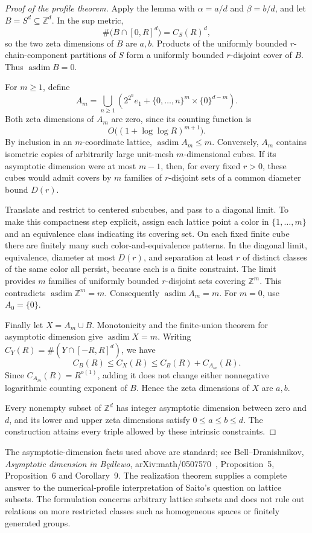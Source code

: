 \documentclass[11pt,a4paper]{article}
\theoremstyle{definition}
\theoremstyle{remark}
\numberwithin{equation}{section}
\begin{document}
\begin{proof}[Proof of the profile theorem]
Apply the lemma with $\alpha=a/d$ and $\beta=b/d$, and let $B=S^d\subseteq\mathbb Z^d$. In the sup metric,
\[
 \#\bigl(B\cap[0,R]^d\bigr)=C_S(R)^d,
\]
so the two zeta dimensions of $B$ are $a,b$. Products of the uniformly bounded $r$-chain-component partitions of $S$ form a uniformly bounded $r$-disjoint cover of $B$. Thus $\operatorname{asdim}B=0$.

For $m\geq1$, define
\[
 A_m=\bigcup_{n\geq1}
 \left(2^{2^n}e_1+\{0,\ldots,n\}^m\times\{0\}^{d-m}\right).
\]
Both zeta dimensions of $A_m$ are zero, since its counting function is
\[
 O\bigl((1+\log\log R)^{m+1}\bigr).
\]
By inclusion in an $m$-coordinate lattice, $\operatorname{asdim}A_m\leq m$. Conversely, $A_m$ contains isometric copies of arbitrarily large unit-mesh $m$-dimensional cubes. If its asymptotic dimension were at most $m-1$, then, for every fixed $r>0$, these cubes would admit covers by $m$ families of $r$-disjoint sets of a common diameter bound $D(r)$.

Translate and restrict to centered subcubes, and pass to a diagonal limit. To make this compactness step explicit, assign each lattice point a color in $\{1,\ldots,m\}$ and an equivalence class indicating its covering set. On each fixed finite cube there are finitely many such color-and-equivalence patterns. In the diagonal limit, equivalence, diameter at most $D(r)$, and separation at least $r$ of distinct classes of the same color all persist, because each is a finite constraint. The limit provides $m$ families of uniformly bounded $r$-disjoint sets covering $\mathbb Z^m$. This contradicts $\operatorname{asdim}\mathbb Z^m=m$. Consequently $\operatorname{asdim}A_m=m$. For $m=0$, use $A_0=\{0\}$.

Finally let $X=A_m\cup B$. Monotonicity and the finite-union theorem for asymptotic dimension give $\operatorname{asdim}X=m$. Writing $C_Y(R)=\#(Y\cap[-R,R]^d)$, we have
\[
 C_B(R)\leq C_X(R)\leq C_B(R)+C_{A_m}(R).
\]
Since $C_{A_m}(R)=R^{o(1)}$, adding it does not change either nonnegative logarithmic counting exponent of $B$. Hence the zeta dimensions of $X$ are $a,b$.

Every nonempty subset of $\mathbb Z^d$ has integer asymptotic dimension between zero and $d$, and its lower and upper zeta dimensions satisfy $0\leq a\leq b\leq d$. The construction attains every triple allowed by these intrinsic constraints.
\end{proof}

The asymptotic-dimension facts used above are standard; see Bell--Dranishnikov, \emph{Asymptotic dimension in B\k{e}dlewo}, arXiv:math/0507570~\cite{BellDranishnikov}, Proposition~5, Proposition~6 and Corollary~9. The realization theorem supplies a complete answer to the numerical-profile interpretation of Saito's question on lattice subsets. The formulation concerns arbitrary lattice subsets and does not rule out relations on more restricted classes such as homogeneous spaces or finitely generated groups.
\end{document}
